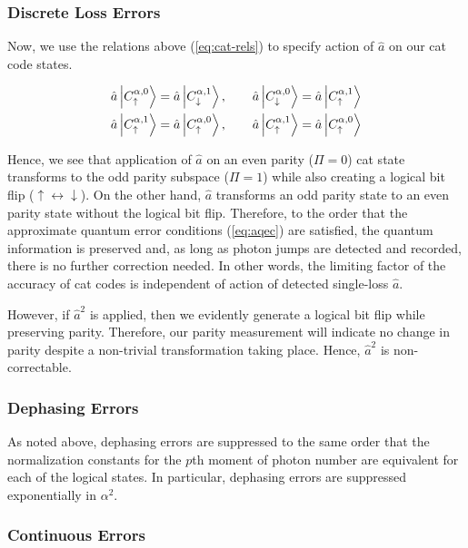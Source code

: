 \documentclass[12]{amsart}
\newcommand\0{\mathbf{0}}
\newcommand\<{\langle}
\renewcommand\>{\rangle}
\begin{document}
\subsubsection{Discrete Loss Errors}

Now, we use the relations above (\ref{eq:cat-rels}) to specify action of $\hat{a}$ on our cat code states.

\begin{align*}
\hat{a}	\ket{C^{\alpha, 0}_{\uparrow}} &= \hat{a}	\ket{C^{\alpha, 1}_{\downarrow}}, \qquad
\hat{a}	\ket{C^{\alpha, 0}_{\downarrow}} = \hat{a}	\ket{C^{\alpha, 1}_{\uparrow}}\\
\hat{a}	\ket{C^{\alpha, 1}_{\uparrow}} &= \hat{a}	\ket{C^{\alpha, 0}_{\uparrow}},\qquad 
\hat{a}	\ket{C^{\alpha, 1}_{\uparrow}} = \hat{a}	\ket{C^{\alpha, 0}_{\uparrow}}
\end{align*}

Hence, we see that application of $\hat{a}$ on an even parity ($\Pi = 0$) cat state transforms to the odd parity subspace ($\Pi = 1$) while also creating a logical bit flip ($\uparrow \leftrightarrow \downarrow$). On the other hand, $\hat{a}$ transforms an odd parity state to an even parity state without the logical bit flip. Therefore, to the order that the approximate quantum error conditions (\ref{eq:aqec}) are satisfied, the quantum information is preserved and, as long as photon jumps are detected and recorded, there is no further correction needed. In other words, the limiting factor of the accuracy of cat codes is independent of action of detected single-loss $\hat{a}$.

However, if $\hat{a}^2$ is applied, then we evidently generate a logical bit flip while preserving parity. Therefore, our parity measurement will indicate no change in parity despite a non-trivial transformation taking place. Hence, $\hat{a}^2$ is non-correctable.

\subsubsection{Dephasing Errors}

As noted above, dephasing errors are suppressed to the same order that the normalization constants for the $p$th moment of photon number are equivalent for each of the logical states. In particular, dephasing errors are suppressed exponentially in $\alpha^2$.

\subsubsection{Continuous Errors}
\end{document}

